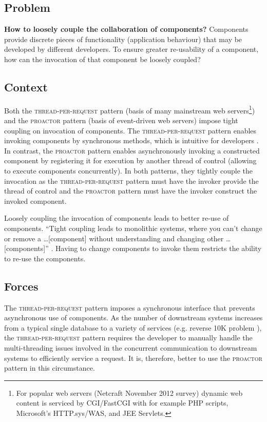 \documentclass[prodmode]{style/acmlarge}
\begin{document}
\subsection{Problem}

\textbf{How to loosely couple the collaboration of components?}  Components
provide discrete pieces of functionality (application behaviour) that may be
developed by different developers.  To ensure greater re-usability of a
component, how can the invocation of that component be loosely coupled?


\subsection{Context}

Both the \textsc{thread-per-request} pattern \cite{thread-per-request} (basis of
many mainstream web servers\footnote{For popular web servers (Netcraft November
2012 survey) dynamic web content is serviced by CGI/FastCGI with for example PHP
scripts, Microsoft's HTTP.sys/WAS, and JEE Servlets.}) and the \textsc{proactor}
pattern \cite{proactor} (basis of event-driven web servers) impose tight
coupling on invocation of components.  The \textsc{thread-per-request} pattern
enables invoking components by synchronous methods, which is intuitive for
developers \cite[p. 2]{proactor}.  In contrast, the \textsc{proactor} pattern
enables asynchronously invoking a constructed component by registering it for
execution by another thread of control (allowing to execute components
concurrently).  In both patterns, they tightly couple the invocation as the
\textsc{thread-per-request} pattern must have the invoker provide the thread of
control and the \textsc{proactor} pattern must have the invoker construct the
invoked component.

Loosely coupling the invocation of components leads to better re-use of
components.  ``Tight coupling leads to monolithic systems, where you can't
change or remove a \ldots [component] without understanding and changing other
\ldots [components]'' \cite[p. 24-25]{gof}.  Having to change components to
invoke them restricts the ability to re-use the components.


\subsection{Forces}

The \textsc{thread-per-request} pattern imposes a synchronous interface that
prevents asynchronous use of components.  As the number of downstream systems
increases from a typical single database to a variety of services (e.g.
reverse 10K problem \cite{reverse-ten-k-problem}), the
\textsc{thread-per-request} pattern requires the developer to manually handle
the multi-threading issues involved in the concurrent communication to
downstream systems to efficiently service a request.  It is, therefore, better
to use the \textsc{proactor} pattern in this circumstance.
\end{document}
